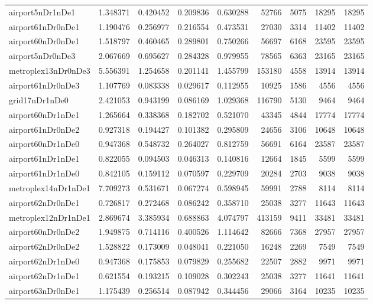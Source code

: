\documentclass[../../../thesis.tex]{subfiles}
\begin{document}
\begin{longtable}{|l|r|r|r|r|r|r|r|r|}
airport5nDr1nDe1 & 1.348371 & 0.420452 & 0.209836 & 0.630288 & 52766 & 5075 & 18295 & 18295 \\
airport61nDr0nDe1 & 1.190476 & 0.256977 & 0.216554 & 0.473531 & 27030 & 3314 & 11402 & 11402 \\
airport60nDr0nDe1 & 1.518797 & 0.460465 & 0.289801 & 0.750266 & 56697 & 6168 & 23595 & 23595 \\
airport5nDr0nDe3 & 2.067669 & 0.695627 & 0.284328 & 0.979955 & 78565 & 6363 & 23165 & 23165 \\
metroplex13nDr0nDe3 & 5.556391 & 1.254658 & 0.201141 & 1.455799 & 153180 & 4558 & 13914 & 13914 \\
airport61nDr0nDe3 & 1.107769 & 0.083338 & 0.029617 & 0.112955 & 10925 & 1586 & 4556 & 4556 \\
grid17nDr1nDe0 & 2.421053 & 0.943199 & 0.086169 & 1.029368 & 116790 & 5130 & 9464 & 9464 \\
airport60nDr1nDe1 & 1.265664 & 0.338368 & 0.182702 & 0.521070 & 43345 & 4844 & 17774 & 17774 \\
airport61nDr0nDe2 & 0.927318 & 0.194427 & 0.101382 & 0.295809 & 24656 & 3106 & 10648 & 10648 \\
airport60nDr1nDe0 & 0.947368 & 0.548732 & 0.264027 & 0.812759 & 56691 & 6164 & 23587 & 23587 \\
airport61nDr1nDe1 & 0.822055 & 0.094503 & 0.046313 & 0.140816 & 12664 & 1845 & 5599 & 5599 \\
airport61nDr1nDe0 & 0.842105 & 0.159112 & 0.070597 & 0.229709 & 20284 & 2703 & 9038 & 9038 \\
metroplex14nDr1nDe1 & 7.709273 & 0.531671 & 0.067274 & 0.598945 & 59991 & 2788 & 8114 & 8114 \\
airport62nDr0nDe1 & 0.726817 & 0.272468 & 0.086242 & 0.358710 & 25038 & 3277 & 11643 & 11643 \\
metroplex12nDr1nDe1 & 2.869674 & 3.385934 & 0.688863 & 4.074797 & 413159 & 9411 & 33481 & 33481 \\
airport60nDr0nDe2 & 1.949875 & 0.714116 & 0.400526 & 1.114642 & 82666 & 7368 & 27957 & 27957 \\
airport62nDr0nDe2 & 1.528822 & 0.173009 & 0.048041 & 0.221050 & 16248 & 2269 & 7549 & 7549 \\
airport62nDr1nDe0 & 0.947368 & 0.175853 & 0.079829 & 0.255682 & 22507 & 2882 & 9971 & 9971 \\
airport62nDr1nDe1 & 0.621554 & 0.193215 & 0.109028 & 0.302243 & 25038 & 3277 & 11641 & 11641 \\
airport63nDr0nDe1 & 1.175439 & 0.256514 & 0.087942 & 0.344456 & 29066 & 3164 & 10235 & 10235 \\

\end{longtable}
\end{document}
